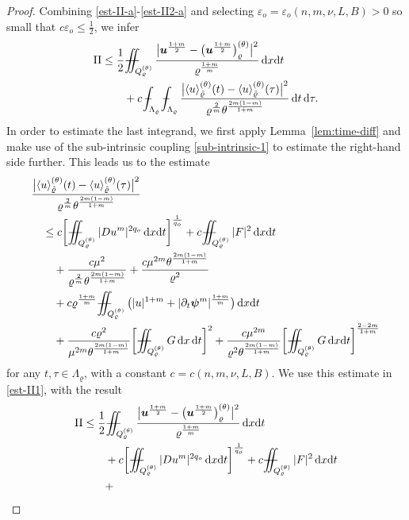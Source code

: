 \documentclass[a4paper, 10pt, american]{amsart}
\numberwithin{theorem}{section}
\numberwithin{equation}{section}
\newcommand{\dxdt}{\,\mathrm{d}x\mathrm{d}t}
\renewcommand{\d}{\,\mathrm{d}}
\newcommand{\dx}{\,\mathrm{d}x}
\newcommand{\dt}{\,\mathrm{d}t}
\renewcommand{\epsilon}{\varepsilon}
\renewcommand{\epsilon}{\varepsilon}
\renewcommand{\rho}{\varrho}
\newcommand{\power}[2]{\bm{#1^{\mbox{\unboldmath{\scriptsize$#2$}}}}}
\def\Xint#1{\mathchoice
    {\XXint\displaystyle\textstyle{#1}}%
    {\XXint\textstyle\scriptstyle{#1}}%
    {\XXint\scriptstyle\scriptscriptstyle{#1}}%
    {\XXint\scriptscriptstyle\scriptscriptstyle{#1}}%
    \!\int}
\def\XXint#1#2#3{\setbox0=\hbox{$#1{#2#3}{\int}$}
    \vcenter{\hbox{$#2#3$}}\kern-0.5\wd0}
\def\bint{\Xint-}
\def\Xiint#1{\mathchoice
    {\XXiint\displaystyle\textstyle{#1}}%
    {\XXiint\textstyle\scriptstyle{#1}}%
    {\XXiint\scriptstyle\scriptscriptstyle{#1}}%
    {\XXiint\scriptscriptstyle\scriptscriptstyle{#1}}%
    \!\iint}
\def\XXiint#1#2#3{\setbox0=\hbox{$#1{#2#3}{\iint}$}
    \vcenter{\hbox{$#2#3$}}\kern-0.5\wd0}
\def\biint{\Xiint{-\!-}}
\def\<{\langle}
\def\>{\rangle}
\begin{document}
\begin{proof}
Combining \eqref{est-II-a}-\eqref{est-II2-a} and selecting
$\epsilon_o=\epsilon_o(n,m,\nu,L,B)>0$ so small that $c\epsilon_o\le\frac12$, we infer
\begin{align}\label{est-II1}
\nonumber
{\rm{II}}
&\le
\frac12 \biint_{Q_{\rho}^{(\theta)}}\frac{\big|\power u{\frac{1+m}2} - \big( \power u{\frac{1+m}2}\big)_{\rho}^{(\theta)}\big|^2}{\rho^{\frac{1+m}m}} \dxdt \\
&\qquad+
c\,\bint_{\Lambda_\rho}\bint_{\Lambda_\rho}\frac{\big| \<u\>_{\hat{\rho}}^{(\theta)}(t) - \<u\>_{\hat{\rho}}^{(\theta)}(\tau) \big|^{2}}{\rho^{\frac{2}m} \theta^{\frac{2m(1-m)}{1+m}}} \dt \d\tau.
\end{align}
In order to estimate the last integrand, we first apply Lemma~\ref{lem:time-diff} and make use of
the sub-intrinsic coupling \eqref{sub-intrinsic-1} to estimate the
right-hand side further. This leads us to the estimate   
\begin{align*}
\nonumber
&\frac{\big|\<u\>_{\hat{\rho}}^{(\theta)}(t)-\<u\>_{\hat{\rho}}^{(\theta)}(\tau)\big|^2}{\rho^{\frac2m}\theta^{\frac{2m(1-m)}{1+m}}}\\\nonumber
&\quad\le
c\bigg[ \biint_{Q_\rho^{(\theta)}} |Du^m|^{2q_o}\dxdt\bigg]^{\frac1{q_o}}
+ 
c\biint_{Q_\rho^{(\theta)}} |F|^2\dxdt\\\nonumber
&\quad\quad+
\frac{c\mu^2}{\rho^{\frac2m}\theta^{\frac{2m(1-m)}{1+m}}}
+
\frac{c\mu^{2m}\theta^{\frac{2m(1-m)}{1+m}}}{\rho^2} \\\nonumber
&\quad\quad+
c\rho^{\frac{1+m}m}
\biint_{Q_\rho^{(\theta)}}\big(|u|^{1+m}+ |\partial_t \power \psi m|^{\frac{1+m}{m}}\big) \dxdt \\
&\quad\quad
+
  \frac{c\rho^{2}}{\mu^{2m}\theta^{\frac{2m(1-m)}{1+m}}}
\bigg[  \biint_{Q_\rho^{(\theta)}}G\dx\dt\bigg]^2
  +
\frac{c\mu^{2m}}{\rho^2\theta^{\frac{2m(1-m)}{1+m}}}\bigg[\biint_{Q_\rho^{(\theta)}}G
\dxdt\bigg]^{\frac{2-2m}{1+m}}
\end{align*}
for any $t,\tau\in\Lambda_\rho$, with a constant $c=c(n,m,\nu,L,B)$.
We use this estimate in \eqref{est-II1}, 
with the result
\begin{align}\label{est-II2}
\nonumber
{\rm{II}}
&\le
\frac12 \biint_{Q_{\rho}^{(\theta)}}\frac{\big|\power u{\frac{1+m}2} - \big( \power u{\frac{1+m}2}\big)_{\rho}^{(\theta)}\big|^2}{\rho^{\frac{1+m}m}} \dxdt \\\nonumber
&\qquad+
c\bigg[ \biint_{Q_\rho^{(\theta)}} |Du^m|^{2q_o}\dxdt\bigg]^{\frac1{q_o}}
+ 
c\biint_{Q_\rho^{(\theta)}} |F|^2\dxdt\\\nonumber
&\quad\quad+

\end{align}
\end{proof}
\end{document}
